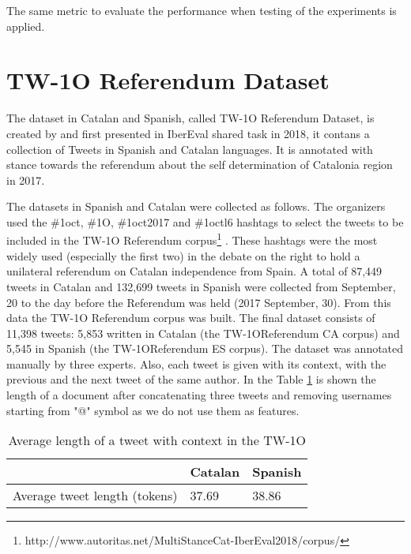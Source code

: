\documentclass[10pt, a4paper]{article}
\begin{document}
The same metric to evaluate the performance when testing of the experiments is applied. 


\section{TW-1O Referendum Dataset}
\label{sec:tw1o_dataset}

The dataset in Catalan and Spanish, called TW-1O Referendum Dataset, is created by \cite{taule18} and first presented in IberEval shared task in 2018, it contans a collection of Tweets in Spanish and Catalan languages. It is annotated with stance towards the referendum about the self determination of Catalonia region in 2017. 

The datasets in Spanish and Catalan were collected as follows. The organizers used the \#1oct, \#1O, \#1oct2017 and \#1octl6 hashtags to select the tweets to be included in the TW-1O Referendum corpus\footnote{http://www.autoritas.net/MultiStanceCat-IberEval2018/corpus/} \cite{taule18}. These hashtags were the most widely used (especially the first two) in the debate on the right to hold a unilateral referendum on Catalan independence from Spain. A total of 87,449 tweets in Catalan and 132,699 tweets in Spanish were collected from September, 20 to the day before the Referendum was held (2017 September, 30). From this data the TW-1O Referendum corpus was built. The final dataset consists of 11,398 tweets: 5,853 written in Catalan (the TW-1OReferendum CA corpus) and 5,545 in Spanish (the TW-1OReferendum ES corpus). The dataset was annotated manually by three experts. Also, each tweet is given with its context, with the previous and the next tweet of the same author. In the Table \ref{tab:length_tw_dataset} is shown the length of a document after concatenating three tweets and removing usernames starting from "@" symbol as we do not use them as features.

\begin{table}[!h]
\begin{center}
\begin{tabularx}{\columnwidth}{|l|l|X|}

      \hline
        &Catalan&Spanish\\
      \hline
        Average tweet length (tokens) & 37.69 & 38.86\\
      \hline


\end{tabularx}
\caption{Average length of a tweet with context in the TW-1O}
 \end{center}
 \label{tab:length_tw_dataset}
\end{table}
\end{document}
